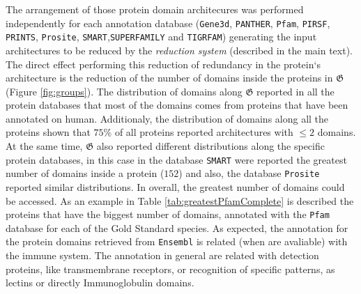\documentclass[12pt]{article}
\begin{document}
The arrangement of those protein domain architecures was performed independently for each annotation database (\texttt{Gene3d}, \texttt{PANTHER}, \texttt{Pfam},  \texttt{PIRSF}, \texttt{PRINTS}, \texttt{Prosite}, \texttt{SMART},\texttt{SUPERFAMILY} and \texttt{TIGRFAM}) generating the input architectures to be reduced by the \textsl{reduction system} (described in the main text). The direct effect performing this reduction of redundancy in the protein`s architecture is the reduction of the number of domains inside the proteins in $\boldsymbol{\mathfrak{G}}$ (Figure \ref{fig:groups}). The distribution of domains along $\boldsymbol{\mathfrak{G}}$ reported in all the protein databases that most of the domains comes from proteins that have been annotated 
on human. Additionaly, the distribution of domains along all the proteins shown that $75$\% of all proteins reported architectures with $\leq 2$ domains. At the same time, $\boldsymbol{\mathfrak{G}}$ also reported different 
distributions along the specific protein databases, in this case in the 
database \texttt{SMART} were reported the greatest number of domains inside a 
protein ($152$) and also, the database \texttt{Prosite} reported similar 
distributions. In overall, the greatest number of domains could be accessed. As an example in Table \ref{tab:greatestPfamComplete} is described the proteins that have the biggest number of domains, annotated with the \texttt{Pfam} database for each of the Gold Standard species. As expected, the annotation for the protein domains retrieved from \texttt{Ensembl} is related (when are avaliable) with the immune system. The annotation in general are related with detection proteins, like transmembrane receptors, or recognition of specific patterns, as lectins or directly Immunoglobulin domains. 
\end{document}
